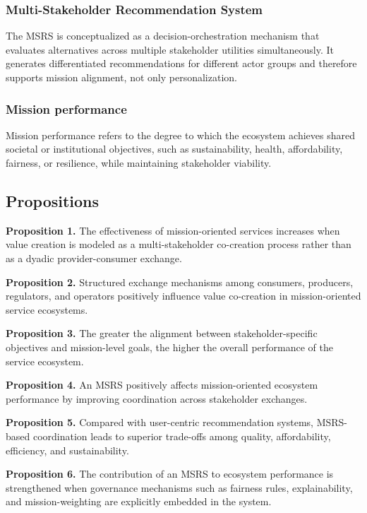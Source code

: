 \documentclass[
  letterpaper,
  DIV=11,
  numbers=noendperiod]{scrartcl}
\begin{document}
\subsubsection{Multi-Stakeholder Recommendation
System}\label{multi-stakeholder-recommendation-system}

The MSRS is conceptualized as a decision-orchestration mechanism that
evaluates alternatives across multiple stakeholder utilities
simultaneously. It generates differentiated recommendations for
different actor groups and therefore supports mission alignment, not
only personalization.

\subsubsection{Mission performance}\label{mission-performance}

Mission performance refers to the degree to which the ecosystem achieves
shared societal or institutional objectives, such as sustainability,
health, affordability, fairness, or resilience, while maintaining
stakeholder viability.

\subsection{Propositions}\label{propositions}

\textbf{Proposition 1.} The effectiveness of mission-oriented services
increases when value creation is modeled as a multi-stakeholder
co-creation process rather than as a dyadic provider-consumer exchange.

\textbf{Proposition 2.} Structured exchange mechanisms among consumers,
producers, regulators, and operators positively influence value
co-creation in mission-oriented service ecosystems.

\textbf{Proposition 3.} The greater the alignment between
stakeholder-specific objectives and mission-level goals, the higher the
overall performance of the service ecosystem.

\textbf{Proposition 4.} An MSRS positively affects mission-oriented
ecosystem performance by improving coordination across stakeholder
exchanges.

\textbf{Proposition 5.} Compared with user-centric recommendation
systems, MSRS-based coordination leads to superior trade-offs among
quality, affordability, efficiency, and sustainability.

\textbf{Proposition 6.} The contribution of an MSRS to ecosystem
performance is strengthened when governance mechanisms such as fairness
rules, explainability, and mission-weighting are explicitly embedded in
the system.
\end{document}
